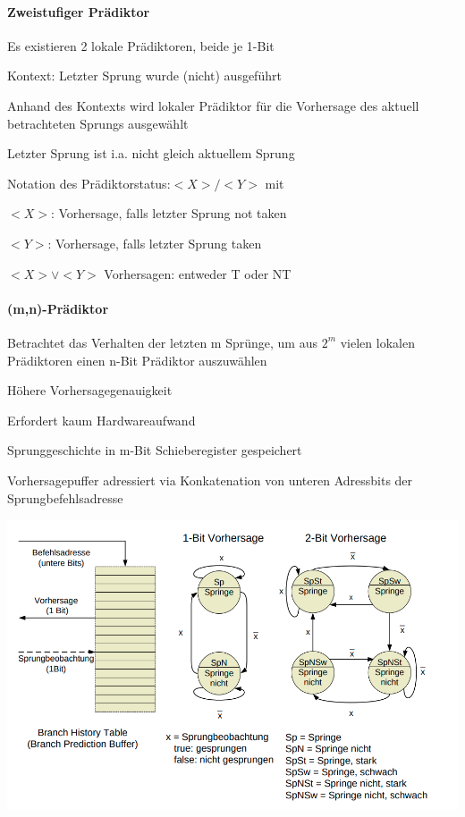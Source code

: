 \documentclass[a4paper]{article}
\begin{document}
\begin{multicols}{3}
  \paragraph{Zweistufiger Prädiktor}
  \begin{itemize*}
    \item Es existieren 2 lokale Prädiktoren, beide je 1-Bit
    \item Kontext: Letzter Sprung wurde (nicht) ausgeführt
    \item Anhand des Kontexts wird lokaler Prädiktor für die Vorhersage des aktuell betrachteten Sprungs ausgewählt
    \item Letzter Sprung ist i.a. nicht gleich aktuellem Sprung
    \item Notation des Prädiktorstatus:$<X>/<Y>$ mit
    \item $<X>$: Vorhersage, falls letzter Sprung not taken
    \item $<Y>$: Vorhersage, falls letzter Sprung taken
    \item $<X>\vee<Y>$ Vorhersagen: entweder T oder NT
  \end{itemize*}
  
  \paragraph{(m,n)-Prädiktor}
  \begin{itemize*}
    \item Betrachtet das Verhalten der letzten m Sprünge, um aus $2^m$ vielen lokalen Prädiktoren einen n-Bit Prädiktor auszuwählen
    \item Höhere Vorhersagegenauigkeit
    \item Erfordert kaum Hardwareaufwand
    \item Sprunggeschichte in m-Bit Schieberegister gespeichert
    \item Vorhersagepuffer adressiert via Konkatenation von unteren Adressbits der Sprungbefehlsadresse
  \end{itemize*}
  
  \begin{center}
    \includegraphics[width=\textwidth/7]{Assets/RA2_Vorhersagen.png}
  \end{center}
  

\end{multicols}
\end{document}
